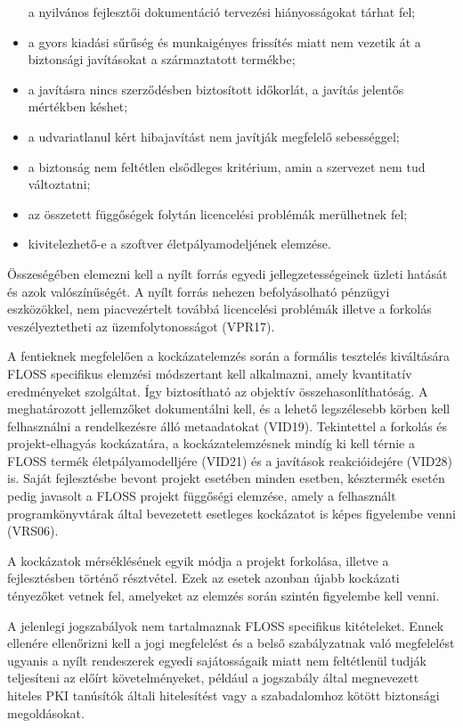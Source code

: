 \documentclass[12pt,magyar,a4paper,oneside]{scrreprt}
\begin{document}
\begin{itemize}
  a nyilvános fejlesztői dokumentáció tervezési hiányosságokat tárhat
  fel;
\item
  a gyors kiadási sűrűség és munkaigényes frissítés miatt nem vezetik át
  a biztonsági javításokat a származtatott termékbe;
\item
  a javításra nincs szerződésben biztosított időkorlát, a javítás
  jelentős mértékben késhet;
\item
  a udvariatlanul kért hibajavítást nem javítják megfelelő sebességgel;
\item
  a biztonság nem feltétlen elsődleges kritérium, amin a szervezet nem
  tud változtatni;
\item
  az összetett függőségek folytán licencelési problémák merülhetnek fel;
\item
  kivitelezhető-e a szoftver életpályamodeljének elemzése.
\end{itemize}

Összeségében elemezni kell a nyílt forrás egyedi jellegzetességeinek
üzleti hatását és azok valószínűségét. A nyílt forrás nehezen
befolyásolható pénzügyi eszközökkel, nem piacvezértelt továbbá
licencelési problémák illetve a forkolás veszélyeztetheti az
üzemfolytonosságot (VPR17).

A fentieknek megfelelően a kockázatelemzés során a formális tesztelés
kiváltására FLOSS specifikus elemzési módszertant kell alkalmazni, amely
kvantitatív eredményeket szolgáltat. Így biztosítható az objektív
összehasonlíthatóság. A meghatározott jellemzőket dokumentálni kell, és
a lehető legszélesebb körben kell felhasználni a rendelkezésre álló
metaadatokat (VID19). Tekintettel a forkolás és projekt-elhagyás
kockázatára, a kockázatelemzésnek mindíg ki kell térnie a FLOSS termék
életpályamodelljére (VID21) és a javítások reakcióidejére (VID28) is.
Saját fejlesztésbe bevont projekt esetében minden esetben, késztermék
esetén pedig javasolt a FLOSS projekt függőségi elemzése, amely a
felhasznált programkönyvtárak által bevezetett esetleges kockázatot is
képes figyelembe venni (VRS06).

A kockázatok mérséklésének egyik módja a projekt forkolása, illetve a
fejlesztésben történő résztvétel. Ezek az esetek azonban újabb kockázati
tényezőket vetnek fel, amelyeket az elemzés során szintén figyelembe
kell venni.

A jelenlegi jogszabályok nem tartalmaznak FLOSS specifikus kitételeket.
Ennek ellenére ellenőrizni kell a jogi megfelelést és a belső
szabályzatnak való megfelelést ugyanis a nyílt rendeszerek egyedi
sajátosságaik miatt nem feltétlenül tudják teljesíteni az előírt
követelményeket, például a jogszabály által megnevezett hiteles PKI
tanúsítók általi hitelesítést vagy a szabadalomhoz kötött biztonsági
megoldásokat.
\end{document}
